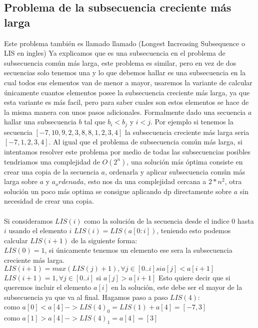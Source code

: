 \subsection{Problema de la subsecuencia creciente más larga}
Este problema también es llamado llamado (Longest Increasing Subsequence o LIS en ingles)
Ya explicamos que es una subsecuencia en el problema de subsecuencia común más larga, este problema es similar, pero en vez de dos secuencias solo tenemos una y lo que debemos hallar es una subsecuencia en la cual todos sus elementos van de menor a mayor, usaremos la variante de calcular únicamente cuantos elementos posee la subsecuencia creciente más larga, ya que esta variante es más facil, pero para saber cuales son estos elementos se hace de la misma manera con unos pasos adicionales. Formalmente dado una secuencia $a$ hallar una subsecuencia $b$ tal que $b_i<b_j$ y $i<j$. Por ejemplo si tenemos la secuencia $[-7, 10, 9, 2, 3, 8, 8, 1, 2, 3, 4]$ la subsecuencia creciente más larga seria $[-7,1,2,3,4]$.
Al igual que el problema de subsecuencia común más larga, si intentamos resolver este problema por medio de todas las subsecuencias posibles tendriamos una complejidad de $O(2^n)$, una solución más óptima consiste en crear una copia de la secuencia $a$, ordenarla y aplicar subsecuencia común más larga sobre $a$ y $a_ordenada$, esto nos da una complejidad cercana a $2*n^2$, otra solución un poco más optima se consigue aplicando dp directamente sobre $a$ sin necesidad de crear una copia. 
\\
\\Si consideramos $LIS(i)$ como la solución de la secuencia desde el indice $0$ hasta $i$ usando el elemento $i$ $LIS(i)=LIS(a[0:i])$, teniendo esto podemos calcular $LIS(i+1)$ de la siguiente forma:
\\$LIS(0) = 1$, si únicamente tenemos un elemento ese sera la subsecuencia creciente más larga.
\\$LIS(i+1) = max(LIS(j)+1), \forall j \in [0..i] si a[j]<a[i+1]$
\\$LIS(i+1) = 1, \forall j \in [0..i]$ si $a[j]>a[i+1]$
Esto quiere decir que si queremos incluir el elemento $a[i]$ en la solución, este debe ser el mayor de la subsecuencia ya que va al final. Hagamos paso a paso $LIS(4)$:
\\como $a[0] < a[4] -> LIS(4)_0 = LIS(1) + a[4] = [-7,3]$
\\como $a[1] > a[4] -> LIS(4)_1 = a[4] = [3]$
